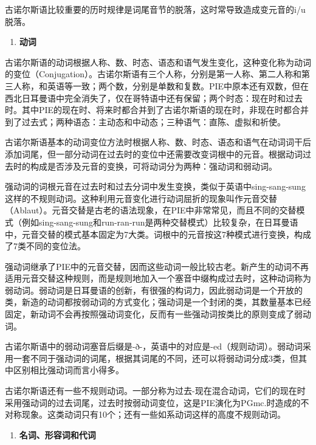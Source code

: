 古诺尔斯语比较重要的历时规律是词尾音节的脱落，这时常导致造成变元音的i/u脱落。

\begin{enumerate}
\def\labelenumi{\Alph{enumi}.}
\setcounter{enumi}{1}
\item
  \textbf{动词}
\end{enumerate}

古诺尔斯语的动词根据人称、数、时态、语态和语气发生变化，这种变化称为动词的变位（Conjugation）。古诺尔斯语有三个人称，分别是第一人称、第二人称和第三人称，和英语等一致；两个数，分别是单数和复数。PIE中原本还有双数，但在西北日耳曼语中完全消失了，仅在哥特语中还有保留；两个时态：现在时和过去时。其中PIE的现在时、将来时都合并到了古诺尔斯语的现在时，非现在时都合并到了过去式；两种语态：主动态和中动态；三种语气：直陈、虚拟和祈使。

古诺尔斯语基本的动词变位方法时根据人称、数、时态、语态和语气在动词词干后添加词尾，但一部分动词在过去时的变位中还需要改变词根中的元音。根据动词过去时的构成是否涉及元音的变换，可将动词分为两种：强动词和弱动词。

强动词的词根元音在过去时和过去分词中发生变换，类似于英语中sing-sang-sung这样的不规则动词。这种利用元音变化进行动词屈折的现象叫作元音交替（Ablaut）。元音交替是古老的语法现象，在PIE中非常常见，而且不同的交替模式（例如sing-sang-sung和run-ran-run是两种交替模式）比较复杂，在日耳曼语中，元音交替的模式基本固定为7大类。词根中的元音按这7种模式进行变换，构成了7类不同的变位法。

强动词继承了PIE中的元音交替，因而这些动词一般比较古老。新产生的动词不再适用元音交替这种规则，而是规则地加入一个塞音中缀构成过去时，这种动词称为弱动词。弱动词是日耳曼语的创新，有很强的构词力，因此弱动词是一个开放的类，新造的动词都按弱动词的方式变化；强动词是一个封闭的类，其数量基本已经固定，新动词不会再按照强动词变化，反而有一些强动词按类比的原则变成了弱动词。

古诺尔斯语中的弱动词塞音后缀是-ð-，英语中的对应是-ed（规则动词）。弱动词采用一套不同于强动词的词尾，根据其词尾的不同，还可以将弱动词分成3类，但其中区别相比强动词而言小得多。

古诺尔斯语还有一些不规则动词。一部分称为过去-现在混合动词，它们的现在时采用强动词的过去词尾，过去时按弱动词变位，这是PIE演化为PGmc.时造成的不对称现象。这类动词只有10个；还有一些如系动词这样的高度不规则动词。

\begin{enumerate}
\def\labelenumi{\Alph{enumi}.}
\setcounter{enumi}{2}
\item
  \textbf{名词、形容词和代词}
\end{enumerate}

